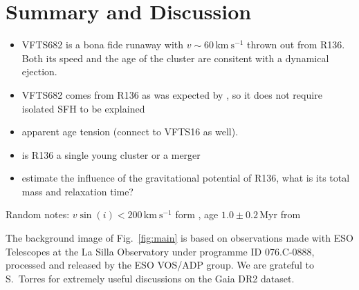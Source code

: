 \documentclass{aa}
\DeclareRobustCommand{\Figref}[1]{Fig.~\ref{#1}}
\begin{document}
\section{Summary and Discussion}
\label{sec:discussion}

\begin{itemize}
\item VFTS682 is a bona fide runaway with $v\sim60\,\mathrm{km\
    s^{-1}}$ thrown out from R136. Both its speed and the age of the
  cluster are consitent with a dynamical ejection.
  \item VFTS682 comes from R136 as was expected by
  \cite{bestenlehner:11, fujii:11, banerjee:12}, so it does not
  require isolated SFH to be explained
\item apparent age tension (connect to VFTS16 as well).
\item is R136 a single young cluster or a merger
\item estimate the influence of the gravitational potential of R136,
  what is its total mass and relaxation time?
\end{itemize}

Random notes: $v\sin(i)<200\,\mathrm{km\ s^{-1}}$ form \cite{schneider:18}, age $1.0\pm 0.2$\,Myr
from \cite{schneider:18}




\begin{acknowledgements}
  The background image of \Figref{fig:main} is based on observations made with ESO Telescopes at the La Silla Observatory under programme ID 076.C-0888, processed and released by the ESO VOS/ADP group.
  We are grateful to S.~Torres for extremely useful discussions on the
  Gaia DR2 dataset.
\end{acknowledgements}
\end{document}
